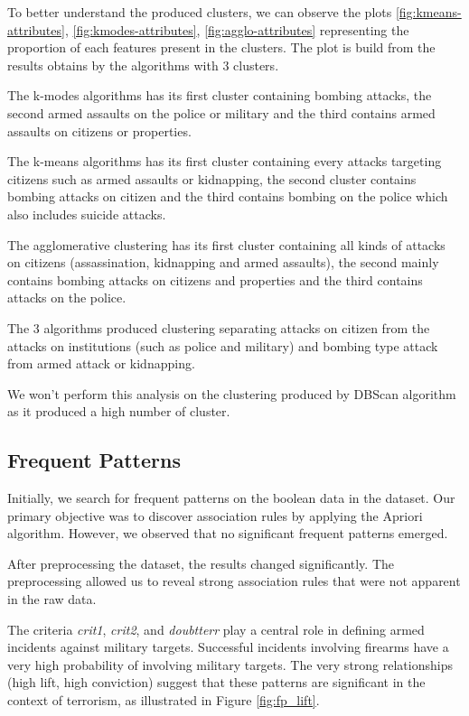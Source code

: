\documentclass{article}
\begin{document}
To better understand the produced clusters, we can observe the plots \ref{fig:kmeans-attributes}, \ref{fig:kmodes-attributes}, \ref{fig:agglo-attributes} representing the proportion of each features present in the clusters. The plot is build from the results obtains by the algorithms with 3 clusters.

The k-modes algorithms has its first cluster containing bombing attacks, the second armed assaults on the police or military and the third contains armed assaults on citizens or properties.

The k-means algorithms has its first cluster containing every attacks targeting citizens such as armed assaults or kidnapping, the second cluster contains bombing attacks on citizen and the third contains bombing on the police which also includes suicide attacks.

The agglomerative clustering has its first cluster containing all kinds of attacks on citizens (assassination, kidnapping and armed assaults), the second mainly contains bombing attacks on citizens and properties and the third contains attacks on the police.

The 3 algorithms produced clustering separating attacks on citizen from the attacks on institutions (such as police and military) and bombing type attack from armed attack or kidnapping.

We won't perform this analysis on the clustering produced by DBScan algorithm as it produced a high number of cluster.


\subsection{Frequent Patterns}

Initially, we search for frequent patterns on the boolean data in the dataset.
Our primary objective was to discover association rules by applying the Apriori algorithm\cite{mlxtend}. However, we observed that no significant frequent patterns emerged.

After preprocessing the dataset, the results changed significantly. The preprocessing allowed us to reveal strong association rules that were not apparent in the raw data.


The criteria \textit{crit1}, \textit{crit2}, and \textit{doubtterr} play a central role in defining armed incidents against military targets. Successful incidents involving firearms have a very high probability of involving military targets. The very strong relationships (high lift, high conviction) suggest that these patterns are significant in the context of terrorism, as illustrated in Figure \ref{fig:fp_lift}.
\end{document}
